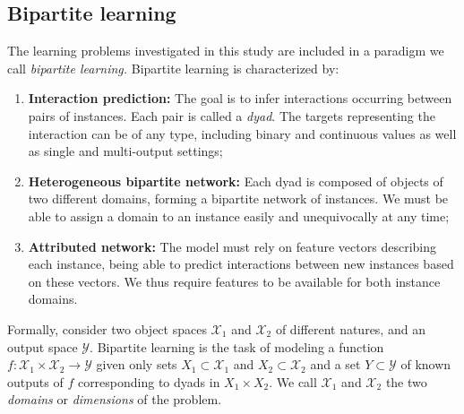 \documentclass[sn-mathphys-num]{sn-jnl}%
\newcommand{\x}{\mathbf{x}}
\theoremstyle{thmstyleone}%
\theoremstyle{thmstyletwo}%
\theoremstyle{thmstylethree}%
\begin{document}
\subsection{Bipartite learning}
\label{sec:bipartite learning}

The learning problems investigated in this study are included in a paradigm we call \emph{bipartite learning.} Bipartite learning is characterized by:
%
\begin{enumerate}
    \item \textbf{Interaction prediction:}
        The goal is to infer interactions occurring between pairs of instances. Each pair is called a \emph{dyad}. The targets representing the interaction can be of any type, including binary and continuous values as well as single and multi-output settings;
    \item \textbf{Heterogeneous bipartite network:}
        Each dyad is composed of objects of two different domains, forming a bipartite network of instances. We must be able to assign a domain to an instance easily and unequivocally at any time;
    \item \textbf{Attributed network:}
        The model must rely on feature vectors describing each instance, being able to predict interactions between new instances based on these vectors. We thus require features to be available for both instance domains.
\end{enumerate}

Formally, consider two object spaces $\mathcal{X}_1$ and $\mathcal{X}_2$ of different natures, and an output space $\mathcal{Y}$.
Bipartite learning is the task of modeling a function $f \colon \mathcal{X}_1 \times \mathcal{X}_2 \to \mathcal{Y}$ given only sets $X_1 \subset \mathcal{X}_1$ and $X_2 \subset \mathcal{X}_2$ and a set $Y\subset \mathcal{Y}$ of known outputs of $f$ corresponding to dyads in $X_1 \times X_2$.
%
We call $\mathcal{X}_1$ and $\mathcal{X}_2$ the two \emph{domains} or \emph{dimensions} of the problem.
\end{document}
